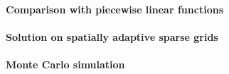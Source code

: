 \dummytext[5]{}

\paragraph{Comparison with piecewise linear functions}

\dummytext[5]{}

\paragraph{Solution on spatially adaptive sparse grids}

\dummytext[5]{}

\paragraph{Monte Carlo simulation}


\dummytext[5]{}
